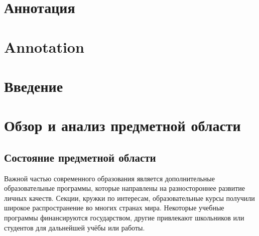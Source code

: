 \documentclass[a4paper,14pt]{article}
\begin{document}


\section*{Аннотация}


\pagebreak

\section*{Annotation}

\pagebreak

\tableofcontents
\pagebreak

\section*{Введение}











\pagebreak


\section{Обзор и анализ предметной области}


\subsection{Состояние предметной области}

Важной частью современного образования является дополнительные образовательные программы, которые направлены на разностороннее развитие личных качеств.
Секции, кружки по интересам, образовательные курсы получили широкое распространение во многих странах мира.
Некоторые учебные программы финансируются государством, другие привлекают школьников или студентов для дальнейшей учёбы или работы.
\end{document}
